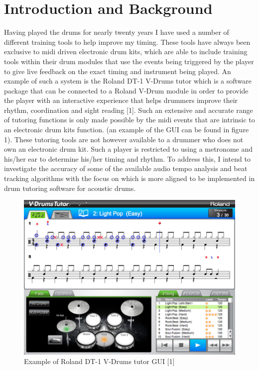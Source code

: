 \documentclass[a4paper, 11pt]{article}
\begin{document}
\maketitle{} \section{Introduction and Background}
Having played the drums for nearly twenty years I have used a number of different training tools to help improve my timing. These tools have always been exclusive to midi driven electronic drum kits, which are able to include training tools within their drum modules that use the events being triggered by the player to give live feedback on the exact timing and instrument being played. An example of such a system is the Roland DT-1 V-Drums tutor which is a software package that can be connected to a Roland V-Drum module in order to provide the player with an interactive experience that helps drummers improve their rhythm, coordination and sight reading [1]. Such an extensive and accurate range of tutoring functions is only made possible by the midi events that are intrinsic to an electronic drum kits function. (an example of the GUI can be found in figure 1). These tutoring tools are not however available to a drummer who does not own an electronic drum kit. Such a player is restricted to using a metronome and his/her ear to determine his/her timing and rhythm. To address this, I intend to investigate the accuracy of some of the available audio tempo analysis and beat tracking algorithms with the focus on which is more aligned to be implemented in drum tutoring software for acoustic drums.
\begin{figure}[h]
\caption{Example of Roland DT-1 V-Drums tutor GUI [1]}
	\centering
	\includegraphics[scale=0.25]{dt-1_ss_main_notation_gal}
\end{figure}
\end{document}
